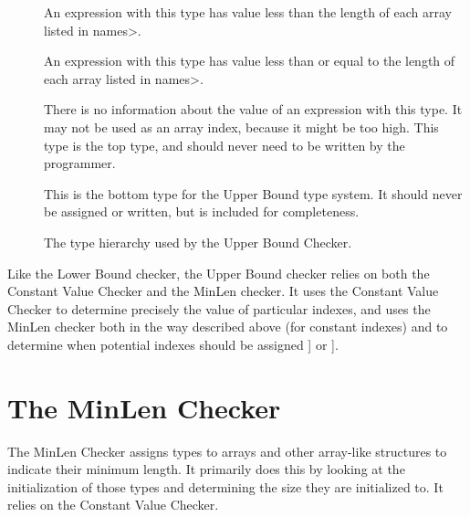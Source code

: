 \begin{description}
\item[]
  An expression with this type
  has value less than the length of each array listed in \<names>.
\item[]
  An expression with this type
  has value less than or equal to the length of each array listed in \<names>.
\item[]
  There is no information about the value of an expression with this type.
  It may not be used as an array index, because it might be too high.
  This type is the top type, and should never need to be written by the
  programmer.
\item[]
  This is the bottom type for the Upper Bound type system. It should
  never be assigned or written, but is included for completeness.
  \end{description}

\begin{figure}
  \caption{The type hierarchy used by the Upper Bound Checker.}
  \label{fig-upperbound-types}
\end{figure}

Like the Lower Bound checker, the Upper Bound checker relies on both the Constant
Value Checker and the MinLen checker. It uses the Constant Value Checker to determine
precisely the value of particular indexes, and uses the MinLen checker both in the way
described above (for constant indexes) and to determine when potential indexes should
be assigned
] or
].


\section{The MinLen Checker\label{index-upperbound}}

The MinLen Checker assigns types to arrays and other array-like structures
to indicate their minimum length. It primarily does this by looking at the
initialization of those types and determining the size they are initialized
to. It relies on the Constant Value Checker.

